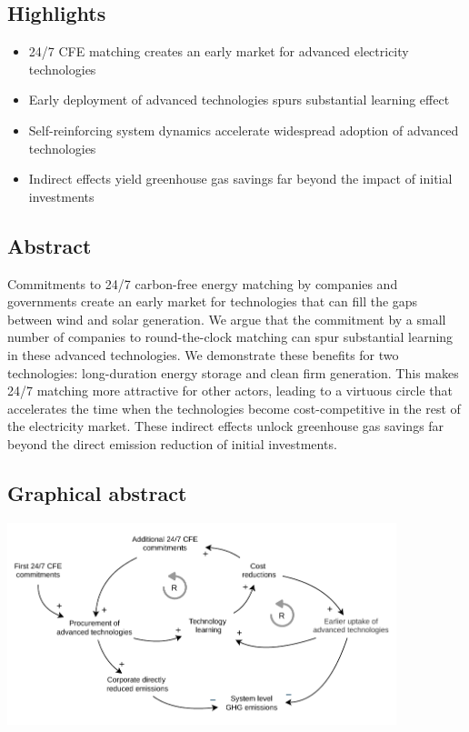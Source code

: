 \documentclass[pdflatex,sn-basic, Numbered]{sn-jnl}
\theoremstyle{thmstyleone}%
\theoremstyle{thmstyletwo}%
\theoremstyle{thmstylethree}%
\begin{document}

\subsection*{Highlights}

\begin{itemize}
\item 24/7 CFE matching creates an early market for advanced electricity technologies
\item Early deployment of advanced technologies spurs substantial learning effect
\item Self-reinforcing system dynamics accelerate widespread adoption of advanced technologies
\item Indirect effects yield greenhouse gas savings far beyond the impact of initial investments
\end{itemize}


\subsection*{Abstract}
Commitments to 24/7 carbon-free energy matching by companies and governments create an early market for technologies that can fill the gaps between wind and solar generation.
We argue that the commitment by a small number of companies to round-the-clock matching can spur substantial learning in these advanced technologies.
We demonstrate these benefits for two technologies: long-duration energy storage and clean firm generation.
This makes 24/7 matching more attractive for other actors, leading to a virtuous circle that accelerates the time when the technologies become cost-competitive in the rest of the electricity market.
These indirect effects unlock greenhouse gas savings far beyond the direct emission reduction of initial investments.


\subsection*{Graphical abstract}

\begin{center}
    \includegraphics[width=0.85\textwidth]{images/virtuous_dynamics.pdf}
\end{center}
\end{document}
